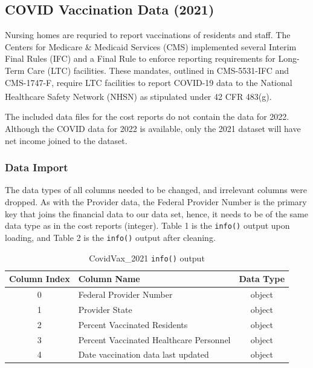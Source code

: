 \documentclass{article}
\theoremstyle{mytheoremstyle}
\theoremstyle{mytheoremstyle}
\theoremstyle{myproblemstyle}
\begin{document}
\pagebreak

\subsection{COVID Vaccination Data (2021)}
Nursing homes are requried to report vaccinations of residents and staff. The Centers for Medicare \& Medicaid Services (CMS) implemented several Interim Final Rules (IFC) and a Final Rule to enforce reporting requirements for Long-Term Care (LTC) facilities. These mandates, outlined in CMS-5531-IFC and CMS-1747-F, require LTC facilities to report COVID-19 data to the National Healthcare Safety Network (NHSN) as stipulated under 42 CFR 483(g).\textsuperscript{\cite{cmsqso2313}}

The included data files for the cost reports do not contain the data for 2022. Although the COVID data for 2022 is available, only the 2021 dataset will have net income joined to the dataset. 

\subsubsection{Data Import}
The data types of all columns needed to be changed, and irrelevant columns were dropped. As with the Provider data, the Federal Provider Number is the primary key that joins the financial data to our data set, hence, it needs to be of the same data type as in the cost reports (integer). Table 1 is the \texttt{info()} output upon loading, and Table 2 is the \texttt{info()} output after cleaning. 
\begin{table}[h]
\centering
\caption{CovidVax\_2021 \texttt{info()} output}
\label{tab:dataframe_structure}
\begin{tabular}{|c|l|c|}
\hline
\textbf{Column Index} & \textbf{Column Name}                               & \textbf{Data Type} \\ \hline
0                     & Federal Provider Number                            & object             \\ \hline
1                     & Provider State                                     & object             \\ \hline
2                     & Percent Vaccinated Residents                       & object             \\ \hline
3                     & Percent Vaccinated Healthcare Personnel            & object             \\ \hline
4                     & Date vaccination data last updated                 & object             \\ \hline
\end{tabular}
\end{table}
\end{document}
